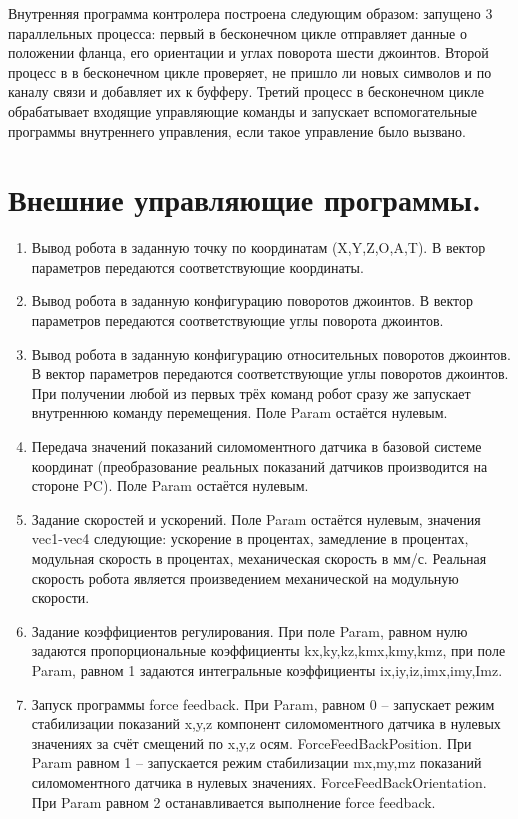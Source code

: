 \documentclass[a4paper,14pt,russian]{extreport} \usepackage{extsizes}
\begin{document}
	 Внутренняя программа контролера построена следующим образом: запущено 3 параллельных процесса: первый в бесконечном цикле отправляет данные о положении фланца, его ориентации и углах поворота шести джоинтов. Второй процесс в в бесконечном цикле проверяет, не пришло ли новых символов и по каналу связи и добавляет их к буфферу. Третий  процесс в бесконечном цикле обрабатывает входящие управляющие команды и запускает вспомогательные программы внутреннего управления, если такое управление было вызвано.
 	 
	 \section{Внешние управляющие программы.}
	 \begin{enumerate}  
	  \item{	Вывод робота в заданную точку по координатам (X,Y,Z,O,A,T). В вектор параметров передаются соответствующие координаты. }
	  \item{	Вывод робота в заданную конфигурацию поворотов джоинтов. В вектор параметров передаются соответствующие углы поворота джоинтов.}
	  \item{	Вывод робота в заданную конфигурацию относительных поворотов джоинтов. В вектор параметров передаются соответствующие углы поворотов джоинтов.
	 При получении любой из первых трёх команд робот сразу же запускает внутреннюю команду перемещения. Поле Param остаётся нулевым.}
	  \item{	Передача значений показаний силомоментного датчика в базовой системе координат (преобразование реальных показаний датчиков производится на стороне PC). Поле Param остаётся нулевым.}
	  \item{	Задание скоростей и ускорений. Поле Param остаётся нулевым, значения vec1-vec4 следующие: ускорение в процентах, замедление в процентах, модульная скорость в процентах, механическая скорость в мм/с. Реальная скорость робота является произведением механической на модульную скорости.}
	  \item{	Задание коэффициентов регулирования. При поле Param, равном нулю задаются пропорциональные коэффициенты kx,ky,kz,kmx,kmy,kmz, при поле Param, равном 1 задаются интегральные коэффициенты  ix,iy,iz,imx,imy,Imz.}
	  \item{	Запуск программы force feedback. При Param, равном 0 – запускает режим стабилизации показаний x,y,z компонент силомоментного датчика в нулевых значениях  за счёт смещений по x,y,z осям. ForceFeedBackPosition. При Param равном 1 – запускается режим стабилизации mx,my,mz показаний силомоментного датчика в нулевых значениях. ForceFeedBackOrientation. При Param равном 2 останавливается выполнение force feedback.}
	\end{enumerate}   
	
\end{document}
